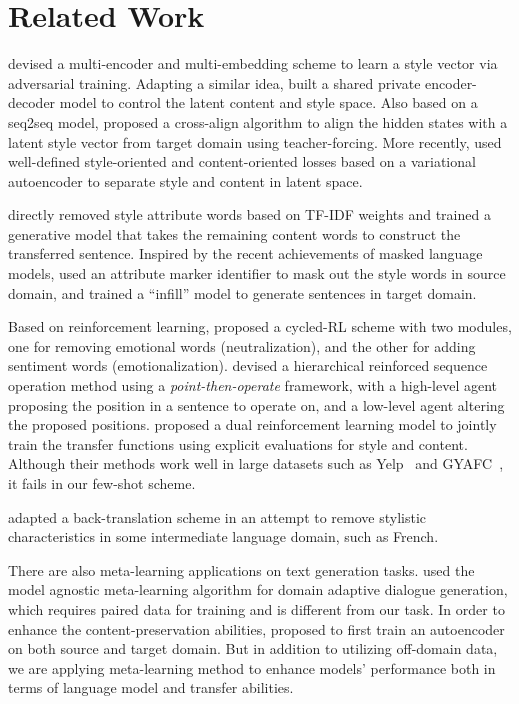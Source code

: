 \section{Related Work}
\label{sec:related}
\citet{fu2018style} devised a multi-encoder and multi-embedding scheme to learn a style vector via adversarial training. Adapting a similar idea, \citet{zhang2018shaped} built a shared private encoder-decoder model to control the latent content and style space. Also based on a seq2seq model, \citet{shen2017style} proposed a cross-align algorithm to align the hidden states with a latent style vector from target domain using teacher-forcing. More recently, \citet{john2018disentangled} used well-defined style-oriented and content-oriented losses based on a variational autoencoder to separate style and content in latent space.

\citet{li2018delete} directly removed style attribute words based on TF-IDF weights and trained a generative model that takes the remaining content words to construct the transferred sentence. Inspired by the recent achievements of masked language models, \citet{wu2019mask} used an attribute marker identifier to mask out the style words in source domain, and trained a ``infill'' model to generate sentences in target domain.

Based on reinforcement learning, \citet{xu2018unpaired} proposed a cycled-RL scheme with two modules, one for removing emotional words (neutralization), and the other for adding sentiment words (emotionalization). \citet{wu2019hierarchical} devised a hierarchical reinforced sequence operation method using a \emph{point-then-operate} framework, with a high-level agent proposing the position in a sentence to operate on, and a low-level agent altering the proposed positions. \citet{luo2019dual} proposed a dual reinforcement learning model to jointly train the transfer functions using explicit evaluations for style and content. Although their methods work well in large datasets such as Yelp~\cite{asghar2016yelp} and GYAFC~\cite{rao2018dear}, it fails in our few-shot scheme.

\citet{prabhumoye2018style} adapted a back-translation scheme in an attempt to remove stylistic characteristics in some intermediate language domain, such as French.

There are also meta-learning applications on text generation tasks. \citet{qian2019domain} used the model agnostic meta-learning algorithm for domain adaptive dialogue generation, which requires paired data for training and is different from our task. In order to enhance the content-preservation abilities, \citet{li2019domain} proposed to first train an autoencoder on both source and target domain. But in addition to utilizing off-domain data, we are applying meta-learning method to enhance models' performance both in terms of language model and transfer abilities.

